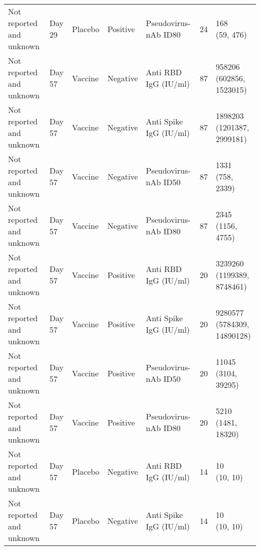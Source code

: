 \documentclass[]{book}
\theoremstyle{definition}
\theoremstyle{definition}
\theoremstyle{definition}
\newcommand{\1}{\mathbbm{1}}
\begin{document}
\begin{landscape}
\begin{ThreePartTable}
\begin{longtable}[t]{>{\raggedright\arraybackslash}p{7cm}llllll}
\hspace{1em}Not reported and unknown & Day 29 & Placebo & Positive & Pseudovirus-nAb ID80 & 24 & \makecell[l]{168\\(59, 476)}\\
\hspace{1em}Not reported and unknown & Day 57 & Vaccine & Negative & Anti RBD IgG (IU/ml) & 87 & \makecell[l]{958206\\(602856, 1523015)}\\
\hspace{1em}Not reported and unknown & Day 57 & Vaccine & Negative & Anti Spike IgG (IU/ml) & 87 & \makecell[l]{1898203\\(1201387, 2999181)}\\
\hspace{1em}Not reported and unknown & Day 57 & Vaccine & Negative & Pseudovirus-nAb ID50 & 87 & \makecell[l]{1331\\(758, 2339)}\\
\hspace{1em}Not reported and unknown & Day 57 & Vaccine & Negative & Pseudovirus-nAb ID80 & 87 & \makecell[l]{2345\\(1156, 4755)}\\
\hspace{1em}Not reported and unknown & Day 57 & Vaccine & Positive & Anti RBD IgG (IU/ml) & 20 & \makecell[l]{3239260\\(1199389, 8748461)}\\
\hspace{1em}Not reported and unknown & Day 57 & Vaccine & Positive & Anti Spike IgG (IU/ml) & 20 & \makecell[l]{9280577\\(5784309, 14890128)}\\
\hspace{1em}Not reported and unknown & Day 57 & Vaccine & Positive & Pseudovirus-nAb ID50 & 20 & \makecell[l]{11045\\(3104, 39295)}\\
\hspace{1em}Not reported and unknown & Day 57 & Vaccine & Positive & Pseudovirus-nAb ID80 & 20 & \makecell[l]{5210\\(1481, 18320)}\\
\hspace{1em}Not reported and unknown & Day 57 & Placebo & Negative & Anti RBD IgG (IU/ml) & 14 & \makecell[l]{10\\(10, 10)}\\
\hspace{1em}Not reported and unknown & Day 57 & Placebo & Negative & Anti Spike IgG (IU/ml) & 14 & \makecell[l]{10\\(10, 10)}\\

\end{longtable}
\end{ThreePartTable}
\end{landscape}
\end{document}
